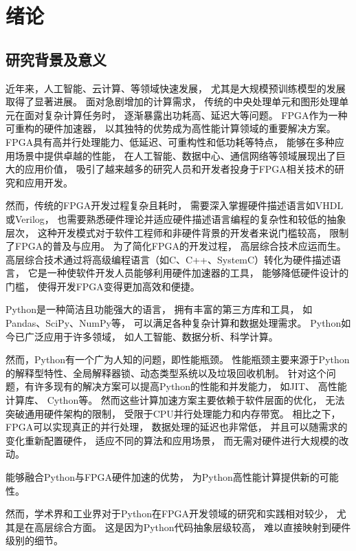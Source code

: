 \section{绪论}

\subsection{研究背景及意义}

近年来，人工智能、云计算、等领域快速发展，
尤其是大规模预训练模型的发展取得了显著进展。
面对急剧增加的计算需求，
传统的中央处理单元和图形处理单元在面对复杂计算任务时，
逐渐暴露出功耗高、延迟大等问题。
FPGA作为一种可重构的硬件加速器，
以其独特的优势成为高性能计算领域的重要解决方案。
FPGA具有高并行处理能力、低延迟、可重构性和低功耗等特点，
能够在多种应用场景中提供卓越的性能，
在人工智能\cite{zeng2024flightllm}、数据中心\cite{center1}\cite{center2}、通信网络\cite{qsg}\cite{mac}等领域展现出了巨大的应用价值，
吸引了越来越多的研究人员和开发者投身于FPGA相关技术的研究和应用开发。

然而，传统的FPGA开发过程复杂且耗时，
需要深入掌握硬件描述语言如VHDL或Verilog，
也需要熟悉硬件理论并适应硬件描述语言编程的复杂性和较低的抽象层次，
这种开发模式对于软件工程师和非硬件背景的开发者来说门槛较高，
限制了FPGA的普及与应用。
为了简化FPGA的开发过程，
高层综合技术\cite{hls}应运而生。
高层综合技术通过将高级编程语言（如C、C++、SystemC）转化为硬件描述语言，
它是一种使软件开发人员能够利用硬件加速器的工具，
能够降低硬件设计的门槛，
使得开发FPGA变得更加高效和便捷。

Python是一种简洁且功能强大的语言，
拥有丰富的第三方库和工具，
如Pandas、SciPy、NumPy等，
可以满足各种复杂计算和数据处理需求。
Python如今已广泛应用于许多领域，
如人工智能、数据分析、科学计算。

然而，Python有一个广为人知的问题，即性能瓶颈。
性能瓶颈主要来源于Python的解释型特性、全局解释器锁、动态类型系统以及垃圾回收机制。
针对这个问题，有许多现有的解决方案可以提高Python的性能和并发能力，
如JIT\cite{rpython}\cite{pypy1}\cite{izawa2022threaded}\cite{pypy2}、
高性能计算库\cite{harris2020array}、
Cython\cite{cython}等。
然而这些计算加速方案主要依赖于软件层面的优化，
无法突破通用硬件架构的限制，
受限于CPU并行处理能力和内存带宽。
相比之下，FPGA可以实现真正的并行处理，
数据处理的延迟也非常低，
并且可以随需求的变化重新配置硬件，
适应不同的算法和应用场景，
而无需对硬件进行大规模的改动。

能够融合Python与FPGA硬件加速的优势，
为Python高性能计算提供新的可能性。

然而，学术界和工业界对于Python在FPGA开发领域的研究和实践相对较少，
尤其是在高层综合方面。
这是因为Python代码抽象层级较高，
难以直接映射到硬件级别的细节。

